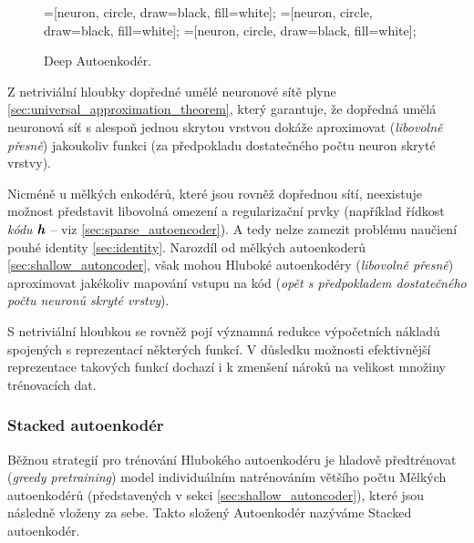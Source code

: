 \begin{figure}[H]
    \centering
    \begin{neuralnetwork}[height=6]
        =[neuron, circle, draw=black, fill=white];
        =[neuron, circle, draw=black, fill=white];
        =[neuron, circle, draw=black, fill=white];
      
        \hiddenlayer[count=4, bias=false]
        \linklayers
        \hiddenlayer[count=2, bias=false]
        \linklayers
        \hiddenlayer[count=4, bias=false]
        \linklayers
        \outputlayer[count=6, text=\xout]
        \linklayers
      \end{neuralnetwork}
    \caption{Deep Autoenkodér.}
    \label{fig:stacked_autoencoder}
\end{figure}

Z netriviální hloubky dopředné umělé neuronové sítě plyne \autoref{sec:universal_approximation_theorem},
který garantuje, že dopředná umělá neuronová síť s alespoň jednou skrytou vrstvou dokáže aproximovat (\emph{libovolně přesně}) jakoukoliv funkci (za předpokladu dostatečného počtu neuron skryté vrstvy).

Nicméně u mělkých enkodérů, které jsou rovněž dopřednou sítí, neexistuje možnost představit libovolná omezení a regularizační prvky (například řídkost \emph{kódu} $\textbf{\emph{h}}$ – viz \autoref{sec:sparse_autoencoder}).
A tedy nelze zamezit problému naučiení pouhé identity \autoref{sec:identity}. Narozdíl od mělkých autoenkoderů \autoref{sec:shallow_autoncoder},
však mohou Hluboké autoenkodéry (\emph{libovolně přesně}) aproximovat jakékoliv mapování vstupu na kód (\emph{opět s předpokladem dostatečného počtu neuronů skryté vrstvy}).

S netriviální hloubkou se rovněž pojí významná redukce výpočetních nákladů spojených s reprezentací některých funkcí. 
V důsledku možnosti efektivnější reprezentace takových funkcí dochazí i k zmenšení nároků na velikost množiny trénovacích dat.


\subsubsection{Stacked autoenkodér}
Běžnou strategií pro trénování Hlubokého autoenkodéru je hladově předtrénovat (\emph{greedy pretraining}) model individuálním natrénováním většího počtu Mělkých autoenkodérů (představených v sekci \autoref{sec:shallow_autoncoder}), které jsou následně vloženy za sebe.
Takto složený Autoenkodér nazýváme Stacked autoenkodér.



